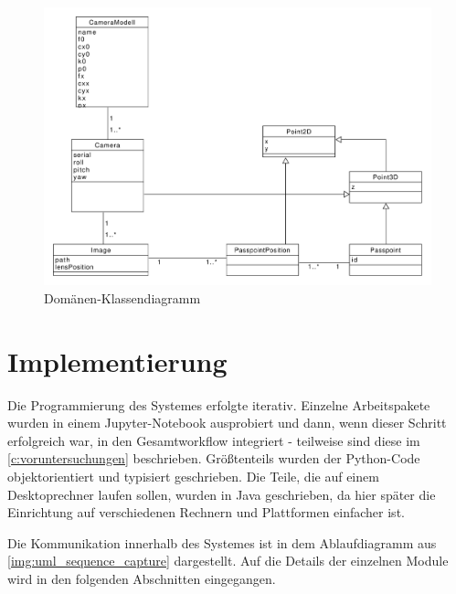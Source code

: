 \documentclass[./00PhotoBox.tex]{subfiles}
\begin{document}
\begin{figure}
    \centering
    \includegraphics[width=1\textwidth]{./img/uml/uml_domain.pdf}
    \caption{Domänen-Klassendiagramm} %
    \label{img:dokladia} %
\end{figure}

\section{Implementierung}
\label{sec:Implementierung}


Die Programmierung des Systemes erfolgte iterativ. Einzelne Arbeitspakete wurden in einem Jupyter-Notebook ausprobiert und dann, wenn dieser Schritt erfolgreich war, in den Gesamtworkflow integriert - teilweise sind diese im \autoref{c:voruntersuchungen} beschrieben. Größtenteils wurden der Python-Code objektorientiert und typisiert geschrieben. Die Teile, die auf einem Desktoprechner laufen sollen, wurden in Java geschrieben, da hier später die Einrichtung auf verschiedenen Rechnern und Plattformen einfacher ist.

Die Kommunikation innerhalb des Systemes ist in dem Ablaufdiagramm aus \autoref{img:uml_sequence_capture} dargestellt. Auf die Details der einzelnen Module wird in den folgenden Abschnitten eingegangen.
\end{document}
